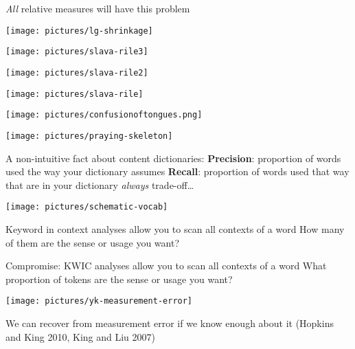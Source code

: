 \documentclass{mediumfoils}
\begin{document}
\textit{All} relative measures will have this problem



 

\centerline{\texttt{[image: pictures/lg-shrinkage]}}
 
 

\centerline{\texttt{[image: pictures/slava-rile3]}}


\centerline{\texttt{[image: pictures/slava-rile2]}}


\centerline{\texttt{[image: pictures/slava-rile]}}


\newpage 
\centerline{\texttt{[image: pictures/confusionoftongues.png]}}



\newpage

\centerline{\texttt{[image: pictures/praying-skeleton]}}


A non-intuitive fact about content dictionaries:
\ita
\itm \textbf{Precision}: proportion of words used the way your dictionary assumes
\itm \textbf{Recall}: proportion of words used that way that are in your dictionary
\itz
\textit{always} trade-off\ldots 


\centerline{\texttt{[image: pictures/schematic-vocab]}}


Keyword in context analyses allow you to scan all contexts of a word
\ita
\itm How many of them are the sense or usage you want?
\itz

Compromise: KWIC analyses allow you to scan all contexts of a word
\ita
\itm What proportion of tokens are the sense or usage you want?
\itz

\newpage

\centerline{\texttt{[image: pictures/yk-measurement-error]}}


We can recover from measurement error if we know enough about it (Hopkins and King 2010, King and Liu 2007)
\end{document}
